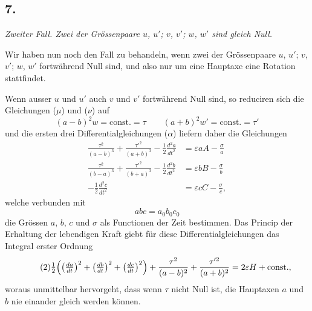 \documentclass[12pt,a4paper]{article}
\begin{document}
\subsection*{7.}

\textit{Zweiter Fall. Zwei der Grössenpaare $u$, $u'$; $v$, $v'$; $w$, $w'$ sind gleich Null.}

Wir haben nun noch den Fall zu behandeln, wenn zwei der Grössenpaare $u$, $u'$; $v$, $v'$; $w$, $w'$ fortwährend Null sind, und also nur um eine Hauptaxe eine Rotation stattfindet.

Wenn ausser $u$ und $u'$ auch $v$ und $v'$ fortwährend Null sind, so reduciren sich die Gleichungen ($\mu$) und ($\nu$) auf
\[ (a-b)^2w = \text{const.} = \tau \qquad (a+b)^2w' = \text{const.} = \tau' \]
und die ersten drei Differentialgleichungen ($\alpha$) liefern daher die Gleichungen
\begin{equation}
\tag{1}
\begin{aligned}
\frac{\tau^2}{(a-b)^3} + \frac{\tau'^2}{(a+b)^3} - \tfrac{1}{2}\frac{d^2a}{dt^2} &= \varepsilon aA - \frac{\sigma}{a}\\
\frac{\tau^2}{(b-a)^3} + \frac{\tau'^2}{(b+a)^3} - \tfrac{1}{2}\frac{d^2b}{dt^2} &= \varepsilon bB - \frac{\sigma}{b}\\
-\tfrac{1}{2}\frac{d^2c}{dt^2} &= \varepsilon cC - \frac{\sigma}{c},
\end{aligned}
\end{equation}
welche verbunden mit
\[ abc = a_0b_0c_0 \]
die Grössen $a$, $b$, $c$ und $\sigma$ als Functionen der Zeit bestimmen. Das Princip der Erhaltung der lebendigen Kraft giebt für diese Differentialgleichungen das Integral erster Ordnung
\begin{equation}
\tag{2} \tfrac{1}{2}\Bigl(\bigl(\tfrac{da}{dt}\bigr)^2 + \bigl(\tfrac{db}{dt}\bigr)^2 + \bigl(\tfrac{dc}{dt}\bigr)^2\Bigr) + \frac{\tau^2}{(a-b)^2} + \frac{\tau'^2}{(a+b)^2} = 2\varepsilon H + \text{const.}, \end{equation}
woraus unmittelbar hervorgeht, dass wenn $\tau$ nicht Null ist, die Hauptaxen $a$ und $b$ nie einander gleich werden können.
\end{document}
